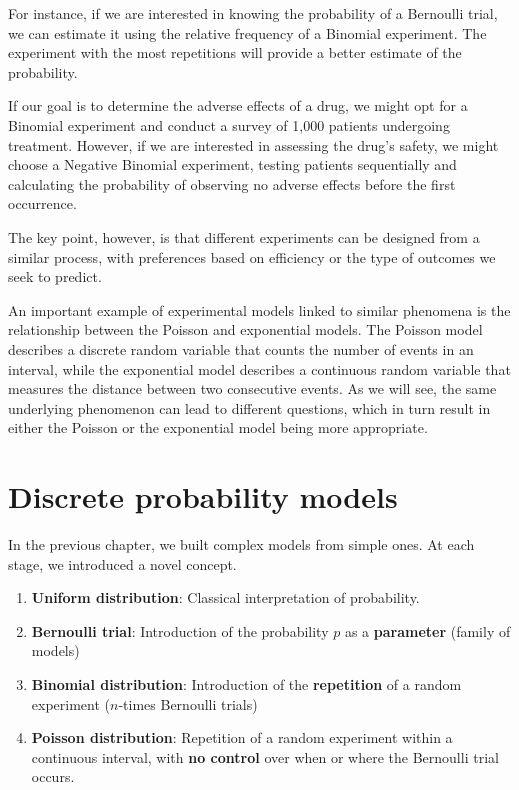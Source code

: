 \documentclass[
]{book}
\begin{document}
For instance, if we are interested in knowing the probability of a Bernoulli trial, we can estimate it using the relative frequency of a Binomial experiment. The experiment with the most repetitions will provide a better estimate of the probability.

If our goal is to determine the adverse effects of a drug, we might opt for a Binomial experiment and conduct a survey of 1,000 patients undergoing treatment. However, if we are interested in assessing the drug's safety, we might choose a Negative Binomial experiment, testing patients sequentially and calculating the probability of observing no adverse effects before the first occurrence.

The key point, however, is that different experiments can be designed from a similar process, with preferences based on efficiency or the type of outcomes we seek to predict.

An important example of experimental models linked to similar phenomena is the relationship between the Poisson and exponential models. The Poisson model describes a discrete random variable that counts the number of events in an interval, while the exponential model describes a continuous random variable that measures the distance between two consecutive events. As we will see, the same underlying phenomenon can lead to different questions, which in turn result in either the Poisson or the exponential model being more appropriate.

\hypertarget{discrete-probability-models-1}{%
\section{Discrete probability models}\label{discrete-probability-models-1}}

In the previous chapter, we built complex models from simple ones. At each stage, we introduced a novel concept.

\begin{enumerate}
\def\labelenumi{\arabic{enumi}.}
\item
  \textbf{Uniform distribution}: Classical interpretation of probability.
\item
  \textbf{Bernoulli trial}: Introduction of the probability \(p\) as a \textbf{parameter} (family of models)
\item
  \textbf{Binomial distribution}: Introduction of the \textbf{repetition} of a random experiment (\(n\)-times Bernoulli trials)
\item
  \textbf{Poisson distribution}: Repetition of a random experiment within a continuous interval, with \textbf{no control} over when or where the Bernoulli trial occurs.
\end{enumerate}
\end{document}
